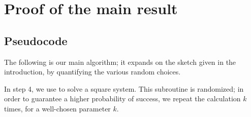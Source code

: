 \documentclass[a4paper]{article}
\begin{document}
\section{Proof of the main result}



\subsection{Pseudocode}
%
The following is our main algorithm; it expands on the sketch given in
the introduction, by quantifying the various random choices.

In step 4, we use \cite[Algorithm 2]{SH} to solve a square
system. This subroutine is randomized; in order to guarantee a higher
probability of success, we repeat the calculation $k$ times, for a
well-chosen parameter $k$.
\end{document}
